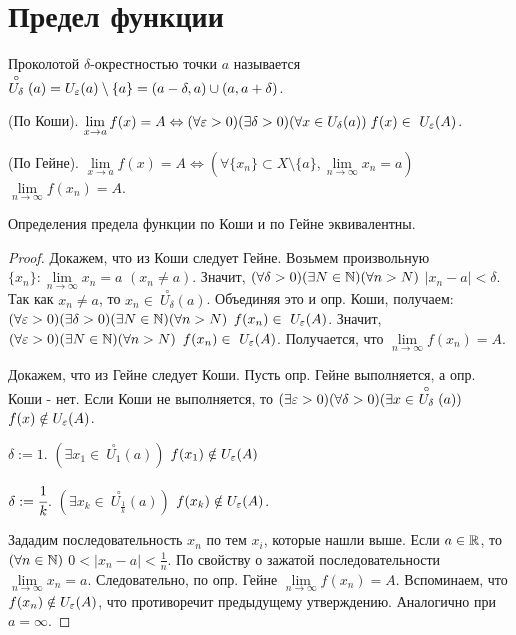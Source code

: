 \newcommand{\dnear}{\stackrel{\circ}{U_\delta}}
\newcommand{\enear}{U_\eps}
\newcommand{\limit}[2]{\lim\limits_{#1 \to #2}} 

\section{Предел функции}
\begin{definition}
	Проколотой $\delta$-окрестностью точки $a$ называется $\dnear(a) = \enear(a) \setminus \{a\} = (a - \delta, a) \cup (a, a + \delta)$.
\end{definition}

\begin{definition}
	(По Коши). $\limit{x}{a} f(x) = A \Leftrightarrow (\forall \eps > 0) (\exists \delta > 0) (\forall x \in U_\delta(a)) \; f(x) \in \ \enear(A)$.
\end{definition}

\begin{definition}
	(По Гейне). $\limit{x}{a} f(x) = A \Leftrightarrow (\forall \{x_n\} \subset X \setminus \{a\}, \limit{n}{\infty} x_n = a)$ $ \limit{n}{\infty} f(x_n) = A$.
\end{definition}

\begin{theorem}
	Определения предела функции по Коши и по Гейне эквивалентны.
\end{theorem}
\begin{proof}
	Докажем, что из Коши следует Гейне. Возьмем произвольную $\{x_n\} : \limit{n}{\infty} x_n = a$ $(x_n \neq a)$. Значит, $(\forall \delta > 0)(\exists N \in \mathbb{N})(\forall n > N)$ $|x_n - a| < \delta$. Так как $x_n \neq a$, то $x_n\in \ \dnear(a)$. Объединяя это и опр. Коши, получаем: $(\forall \varepsilon > 0)(\exists \delta > 0)(\exists N \in \mathbb{N})(\forall n > N)$ $f(x_n) \in \ \enear(A)$. Значит, $(\forall \varepsilon > 0)(\exists N \in \mathbb{N})(\forall n > N)$ $f(x_n) \in \ \enear(A)$. Получается, что $\limit{n}{\infty} f(x_n) = A$.
	
	Докажем, что из Гейне следует Коши. Пусть опр. Гейне выполняется, а опр. Коши - нет. Если Коши не выполняется, то $(\exists \eps > 0)(\forall \delta > 0)(\exists x \in \ \dnear(a))$ $f(x) \notin \enear(A)$.
	
	$\delta := 1$. $(\exists x_1 \in \ \stackrel{\circ}{U_1}(a))$ $f(x_1) \notin \enear(A)$
	
	$\delta := \cfrac{1}{k}$. $(\exists x_k \in \ \stackrel{\circ}{U_{\frac{1}{k}}}(a))$ $f(x_k) \notin \enear(A)$.
	
	Зададим последовательность $x_n$ по тем $x_i$, которые нашли выше. Если $a \in \mathbb{R}$, то $(\forall n \in \mathbb{N})$ $0 < |x_n - a| < \frac{1}{n}$. По свойству о зажатой последовательности $\limit{n}{\infty} x_n = a$. Следовательно, по опр. Гейне $\limit{n}{\infty} f(x_n) = A$. Вспоминаем, что $f(x_n) \notin \enear(A)$, что противоречит предыдущему утверждению. Аналогично при $a = \infty$.
\end{proof}

